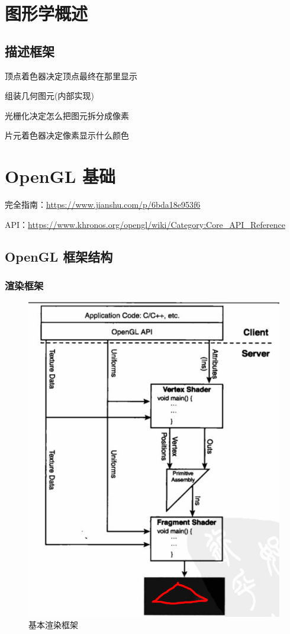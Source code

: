 \documentclass[UTF8,a4paper,12pt]{ctexbook}
\begin{document}
\newpage
\chapter{图形学概述}
	\section{描述框架}
		顶点着色器决定顶点最终在那里显示
		
		组装几何图元(内部实现)
		
		光栅化决定怎么把图元拆分成像素
		
		片元着色器决定像素显示什么颜色
	


\newpage
\chapter{OpenGL 基础}
	完全指南：\url{https://www.jianshu.com/p/6bda18e953f6}
	
	API：\url{https://www.khronos.org/opengl/wiki/Category:Core_API_Reference}
	
	\section{OpenGL 框架结构}
	
		\subsection{渲染框架}
			\begin{figure}[H]
				\centering
				\includegraphics[width=.91\linewidth]{openGlArch}
				\caption{基本渲染框架}
			\end{figure}
			
\end{document}
